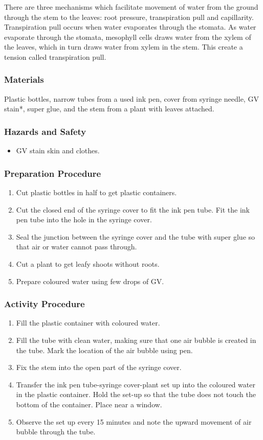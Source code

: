 There are three mechanisms which facilitate movement of water from the ground through the stem to the leaves: root pressure, transpiration pull and capillarity. Transpiration pull occurs when water evaporates through the stomata. As water evaporate through the stomata, mesophyll cells draws water from the xylem of the leaves, which in turn draws water from xylem in the stem. This create a tension called transpiration pull.

\subsubsection*{Materials}
Plastic bottles, narrow tubes from a used ink pen, cover from syringe needle, GV stain*, super glue, and the stem from a plant with leaves attached.

\subsubsection*{Hazards and Safety}
\begin{itemize}
\item{GV stain skin and clothes.}
\end{itemize}

\subsubsection*{Preparation Procedure}
\begin{enumerate}
\item{Cut plastic bottles in half to get plastic containers.}
\item{Cut the closed end of the syringe cover to fit the ink pen tube. Fit the ink pen tube into the hole in the syringe cover.}
\item{Seal the junction between the syringe cover and the tube with super glue so that air or water cannot pass through.}
\item{Cut a plant to get leafy shoots without roots.}
\item{Prepare coloured water using few drops of GV.}
\end{enumerate}

\subsubsection*{Activity Procedure}
\begin{enumerate}
\item{Fill the plastic container with coloured water.}
\item{Fill the tube with clean water, making sure that one air bubble is created in the tube. Mark the location of the air bubble using pen.}
\item{Fix the stem into the open part of the syringe cover.}
\item{Transfer the ink pen tube-syringe cover-plant set up into the coloured water in the plastic container. Hold the set-up so that the tube does not touch the bottom of the container. Place near a window.}
\item{Observe the set up every 15 minutes and note the upward movement of air bubble through the tube.}
\end{enumerate}


